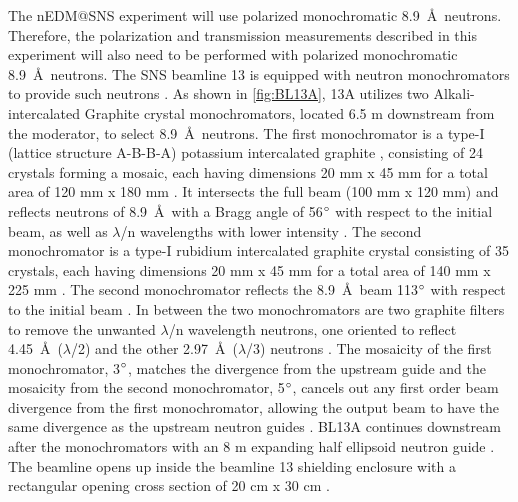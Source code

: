 The nEDM@SNS experiment will use polarized monochromatic 8.9~\AA\ neutrons. Therefore, the polarization and transmission measurements described in this experiment will also need to be performed with polarized monochromatic 8.9~\AA\ neutrons. The SNS beamline 13 is equipped with neutron monochromators to provide such neutrons \cite{Fomin2015}. As shown in \cref{fig:BL13A}, 13A utilizes two Alkali-intercalated Graphite crystal monochromators, located 6.5 m downstream from the moderator, to select 8.9~\AA\ neutrons. The first monochromator is a type-I (lattice structure A-B-B-A) potassium intercalated graphite \cite{Mattoni2004, Courtois2011}, consisting of 24 crystals forming a mosaic, each having dimensions 20 mm x 45 mm for a total area of 120 mm x 180 mm \cite{Fomin2015}. It intersects the full beam (100 mm x 120 mm) and reflects neutrons of 8.9~\AA\ with a Bragg angle of 56$\degree$ with respect to the initial beam, as well as $\lambda$/n wavelengths with lower intensity \cite{Fomin2015}. The second monochromator is a type-I rubidium intercalated graphite crystal consisting of 35 crystals, each having dimensions 20 mm x 45 mm for a total area of 140 mm x 225 mm \cite{Fomin2015}. The second monochromator reflects the 8.9~\AA\ beam 113$\degree$ with respect to the initial beam \cite{Fomin2015}. In between the two monochromators are two graphite filters to remove the unwanted $\lambda$/n wavelength neutrons, one oriented to reflect 4.45~\AA\ ($\lambda$/2) and the other 2.97~\AA\ ($\lambda$/3) neutrons \cite{Fomin2015}. The mosaicity of the first monochromator, 3$\degree$, matches the divergence from the upstream guide and the mosaicity from the second monochromator, 5$\degree$, cancels out any first order beam divergence from the first monochromator, allowing the output beam to have the same divergence as the upstream neutron guides \cite{Mattoni2004, Courtois2011}. BL13A continues downstream after the monochromators with an 8 m expanding half ellipsoid neutron guide \cite{Fomin2015}. The beamline opens up inside the beamline 13 shielding enclosure with a rectangular opening cross section of 20 cm x 30 cm \cite{Fomin2015}.


